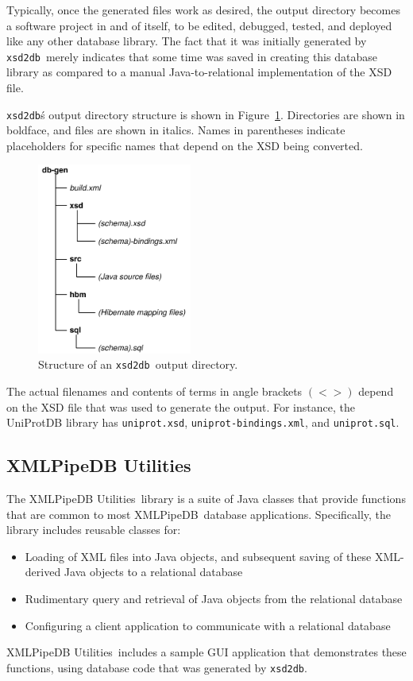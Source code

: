 \documentclass[10pt]{bmc_article}
\newenvironment{bmcformat}{\begin{raggedright}\baselineskip20pt\sloppy\setboolean{publ}{false}}{\end{raggedright}\baselineskip20pt\sloppy}
\def\xmlpipedb{XMLPipeDB}                       %
\def\xsd2db{\texttt{xsd2db}}
\def\xpdutils{XMLPipeDB Utilities}
\begin{document}
\begin{bmcformat}
Typically, once the generated files work as desired, the output directory becomes a software project in and of itself, to be edited, debugged, tested, and deployed like any other database library.  The fact that it was initially generated by \xsd2db\ merely indicates that some time was saved in creating this database library as compared to a manual Java-to-relational implementation of the XSD file.\pb

\xsd2db\'s output directory structure is shown in Figure~\ref{output}.  Directories are shown in boldface, and files are shown in italics.  Names in parentheses indicate placeholders for specific names that depend on the XSD being converted.\pb

\begin{figure}[htbp] %
   \centering
   \includegraphics[width=2in]{figures/db-gen.pdf} 
   \caption{Structure of an \xsd2db\ output directory.}
   \label{output}
\end{figure}

The actual filenames and contents of terms in angle brackets $(< >)$ depend on the XSD file that was used to generate the output.  For instance, the UniProtDB library has \texttt{uniprot.xsd}, \texttt{uniprot-bindings.xml}, and \texttt{uniprot.sql}.\pb

\subsection*{\xpdutils}

The \xpdutils\ library is a suite of Java classes that provide functions that are common to most \xmlpipedb\ database applications.  Specifically, the library includes reusable classes for:
\begin{itemize}
\item Loading of XML files into Java objects, and subsequent saving of these XML-derived Java objects to a relational database
\item Rudimentary query and retrieval of Java objects from the relational database
\item Configuring a client application to communicate with a relational database
\end{itemize}
\xpdutils\ includes a sample GUI application that demonstrates these functions, using database code that was generated by \xsd2db.\pb


\end{bmcformat}
\end{document}
